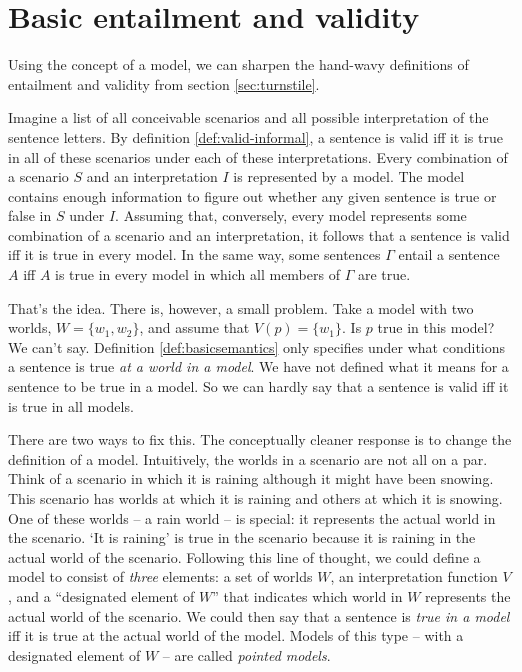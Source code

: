 \section{Basic entailment and validity}%
\label{sec:redefining}

Using the concept of a model, we can sharpen the hand-wavy definitions of
entailment and validity from section \ref{sec:turnstile}.

Imagine a list of all conceivable scenarios and all possible interpretation of
the sentence letters. By definition \ref{def:valid-informal}, a sentence is
valid iff it is true in all of these scenarios under each of these
interpretations. Every combination of a scenario $S$ and an interpretation $I$
is represented by a model. The model contains enough information to figure out
whether any given sentence is true or false in $S$ under $I$. Assuming that,
conversely, every model represents some combination of a scenario and an
interpretation, it follows that a sentence is valid iff it is true in every
model. In the same way, some sentences $\Gamma$ entail a sentence $A$ iff $A$ is
true in every model in which all members of $\Gamma$ are true.

That's the idea. There is, however, a small problem. Take a model with two
worlds, $W = \{ w_{1}, w_{2} \}$, and assume that $V(p) = \{ w_{1} \}$. Is $p$
true in this model? We can't say. Definition \ref{def:basicsemantics} only
specifies under what conditions a sentence is true \emph{at a world in a model}.
We have not defined what it means for a sentence to be true in a model. So we
can hardly say that a sentence is valid iff it is true in all models.

There are two ways to fix this. The conceptually cleaner response is to change
the definition of a model. Intuitively, the worlds in a scenario are not all on
a par. Think of a scenario in which it is raining although it might have been
snowing. This scenario has worlds at which it is raining and others at which it
is snowing. One of these worlds -- a rain world -- is special: it represents the
actual world in the scenario. `It is raining' is true in the scenario because it
is raining in the actual world of the scenario. Following this line of thought,
we could define a model to consist of \emph{three} elements: a set of worlds
$W$, an interpretation function $V$, and a ``designated element of $W$'' that
indicates which world in $W$ represents the actual world of the scenario. We
could then say that a sentence is \emph{true in a model} iff it is true at the
actual world of the model. Models of this type -- with a designated element of
$W$ -- are called \emph{pointed models}.


